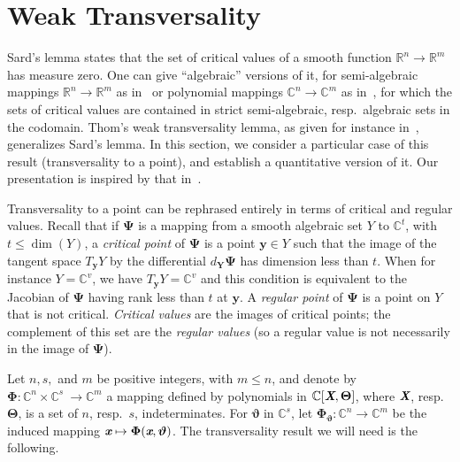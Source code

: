 \documentclass[sigconf]{acmart}
\def\Xb{\textit{\textbf{X}}}
\def\Thetab{\bm{\Theta}}
\def\thetab{\bm{\vartheta}}
\def\xb{\textit{\textbf{x}}}
\def\C{\mathbb{C}}
\def\R{\mathbb{R}}
\def\dt{s}
\begin{document}
\section{Weak Transversality}

Sard's lemma states that the set of critical values of a smooth
function $\R^n \to \R^m$ has measure zero. One can give ``algebraic''
versions of it, for semi-algebraic mappings $\R^n \to \R^m$ as
in~\cite[Chapter~9]{bochnak1998real} or polynomial mappings $\C^n \to
\C^m$ as in~\cite[Chapter~3]{Mumford76}, for which the sets of critical
values are contained in strict semi-algebraic, resp.\ algebraic sets
in the codomain. Thom's weak transversality lemma, as given for
instance in~\cite{demazure2000bifurcations}, generalizes Sard's
lemma. In this section, we consider a particular case of this result
(transversality to a point), and establish a quantitative version of
it. Our presentation is inspired by that in~\cite{TWT}.


Transversality to a point can be rephrased entirely in terms of
critical and regular values. Recall that if $\bm \Psi$ is a mapping
from a smooth algebraic set $Y$ to $\C^t$, with $t\le \dim(Y)$, a {\em
  critical point} of $\bm \Psi$ is a point $\bm y \in Y$ such that the
image of the tangent space $T_{\bm y} Y$ by the differential $d_{\bm
  Y} \bm \Psi$ has dimension less than $t$. When for instance
$Y=\C^v$, we have $T_{\bm y} Y=\C^v$ and this condition is equivalent
to the Jacobian of $\bm \Psi$ having rank less than $t$ at $\bm y$.  A
{\em regular point} of $\bm \Psi$ is a point on $Y$ that is not
critical. {\em Critical values} are the images of critical points; the
complement of this set are the {\em regular values} (so a regular
value is not necessarily in the image of $\bm\Psi$).

Let $n,\dt,$ and $m$ be positive integers, with $m \le n$, and denote
by $\bm\Phi :\C^n \times \C^{\dt} ~ \rightarrow \C^{m}$ a mapping
defined by polynomials in $\C[\Xb,\Thetab]$, where $\Xb$,
resp.\ $\Thetab$, is a set of $n$, resp.\ $\dt$, indeterminates.  For
$\thetab$ in $\C^{\dt}$, let $\bm\Phi_{\thetab} : \C^n \rightarrow
\C^{m}$ be the induced mapping $\xb\mapsto \bm\Phi(\xb,\thetab)$.  The
transversality result we will need is the following.
\end{document}
